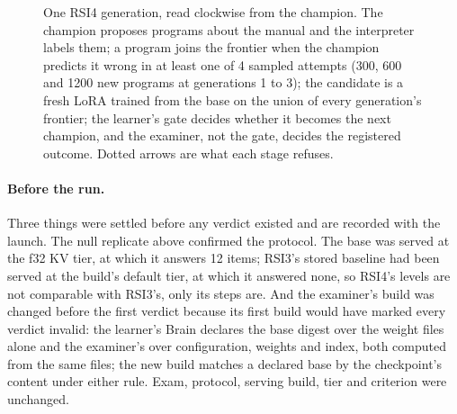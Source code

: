 \begin{figure}[tbp]
\caption{One RSI4 generation, read clockwise from the champion. The champion proposes programs about
the manual and the interpreter labels them; a program joins the frontier when the champion predicts it
wrong in at least one of 4 sampled attempts (300, 600 and 1200 new programs at generations 1 to 3); the
candidate is a fresh LoRA trained from the base on the union of every generation's frontier; the
learner's gate decides whether it becomes the next champion, and the examiner, not the gate, decides
the registered outcome. Dotted arrows are what each stage refuses.}\label{fig:rsi-cycle}
\end{figure}

\paragraph{Before the run.} Three things were settled before any verdict existed and are recorded
with the launch. The null replicate above confirmed the protocol. The base was served at the f32 KV
tier, at which it answers 12 items; RSI3's stored baseline had been served at the build's default tier,
at which it answered none, so RSI4's levels are not comparable with RSI3's, only its steps
are. And the examiner's build was changed before the first verdict because its first
build would have marked every verdict invalid: the learner's Brain declares the base digest over the
weight files alone and the examiner's over configuration, weights and index, both computed from the
same files; the new build matches a declared base by the checkpoint's content under either rule.
Exam, protocol, serving build, tier and criterion were unchanged.

\begin{table}[tbp]
\centering\small
\setlength{\tabcolsep}{3.4pt}

\caption{RSI3 and RSI4 as the examiner decided them: items right of 889 at the base and each
generation, and each step's wins/losses against its predecessor with the exact one-sided sign test
over the items no compared model trained on (in RSI4's r2 one item was excluded). A step holds at
$p<0.05$ with wins above losses; the series' criterion is that at least three lineages hold at every
step. Pooled rows sum the lineage rows (they equal the plan verdict's) and are descriptive, without a test, because the lineages share the exam's items. $^\dagger$~r2 is compared on the 888 items left after one overlapping item was excluded; at generation~3 it answered 242 of the 889 before the exclusion. RSI4 trained on \mRsiFourDevRZeroGOneTrainedRecords{}, \mRsiFourDevRZeroGTwoTrainedRecords{} and \mRsiFourDevRZeroGThreeTrainedRecords{} cumulative records at generations 1 to 3. RSI3's base was
served at a different KV tier from RSI4's, so the levels of the two series differ by setup; compare
steps, not levels.}\label{tab:rsi}
\end{table}

